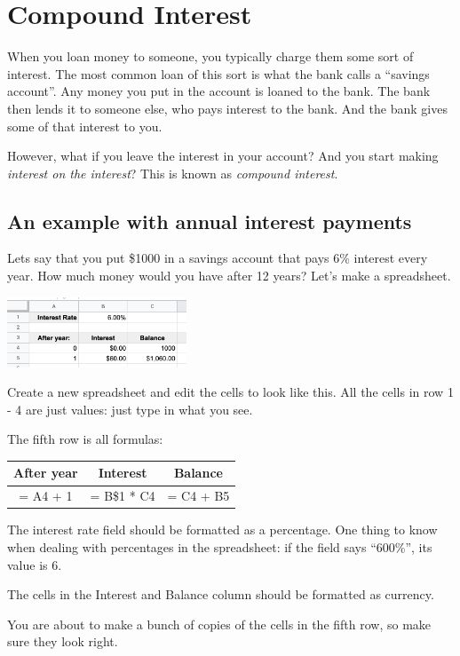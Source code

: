 \chapter{Compound Interest}

When you loan money to someone, you typically charge them some sort of
interest. The most common loan of this sort is what the bank calls a
``savings account''.  Any money you put in the account is loaned to
the bank. The bank then lends it to someone else, who pays interest to
the bank. And the bank gives some of that interest to you.

However, what if you leave the interest in your account? And you start
making \textit{interest on the interest}? This is known as
\textit{compound interest}.

\section{An example with annual interest payments}

Lets say that you put \$1000 in a savings account that pays 6\%
interest every year. How much money would you have after 12 years?
Let's make a spreadsheet.

\includegraphics[width=0.4\textwidth]{StartInterest.png}

Create a new spreadsheet and edit the cells to look like this.  All
the cells in row 1 - 4 are just values: just type in what you
see.

The fifth row is all formulas:

\begin{tabular}{c | c | c}
  After year & Interest & Balance \\
  \hline 
  = A4 + 1 & = B\$1 * C4 & = C4 + B5 \\
\end{tabular}

The interest rate field should be formatted as a percentage. One thing
to know when dealing with percentages in the spreadsheet: if the field
says ``600\%'', its value is 6. 

The cells in the Interest and Balance column should be formatted as currency.

You are about to make a bunch of copies of the cells in the fifth row,
so make sure they look right.

